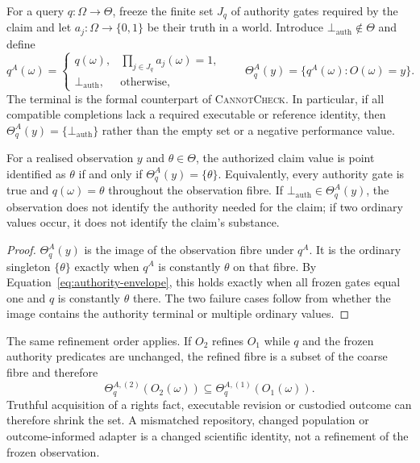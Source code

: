 For a query $q:\Omega\to\Theta$, freeze the finite set $J_q$ of authority
gates required by the claim and let $a_j:\Omega\to\{0,1\}$ be their truth in a
world. Introduce $\bot_{\mathrm{auth}}\notin\Theta$ and define
\begin{equation}
 q^A(\omega)=
 \begin{cases}
 q(\omega),&\prod_{j\in J_q}a_j(\omega)=1,\\
 \bot_{\mathrm{auth}},&\text{otherwise},
 \end{cases}
 \qquad
 \Theta^A_q(y)=\{q^A(\omega):O(\omega)=y\}.
 \label{eq:authority-envelope}
\end{equation}
The terminal is the formal counterpart of \textsc{CannotCheck}. In
particular, if all compatible completions lack a required executable or
reference identity, then $\Theta^A_q(y)=\{\bot_{\mathrm{auth}}\}$ rather than
the empty set or a negative performance value.

\begin{theorem}
\label{thm:authority-fibre}
For a realised observation $y$ and $\theta\in\Theta$, the authorized claim
value is point identified as $\theta$ if and only if
$\Theta^A_q(y)=\{\theta\}$. Equivalently, every authority gate is true and
$q(\omega)=\theta$ throughout the observation fibre. If
$\bot_{\mathrm{auth}}\in\Theta^A_q(y)$, the observation does not identify the
authority needed for the claim; if two ordinary values occur, it does not
identify the claim's substance.
\end{theorem}

\begin{proof}
$\Theta^A_q(y)$ is the image of the observation fibre under $q^A$. It is the
ordinary singleton $\{\theta\}$ exactly when $q^A$ is constantly $\theta$ on
that fibre. By Equation~\eqref{eq:authority-envelope}, this holds exactly when
all frozen gates equal one and $q$ is constantly $\theta$ there. The two
failure cases follow from whether the image contains the authority terminal or
multiple ordinary values.
\end{proof}

The same refinement order applies. If $O_2$ refines $O_1$ while $q$ and the
frozen authority predicates are unchanged, the refined fibre is a subset of
the coarse fibre and therefore
\begin{equation}
 \Theta_q^{A,(2)}(O_2(\omega))
 \subseteq
 \Theta_q^{A,(1)}(O_1(\omega)).
 \label{eq:authority-refinement}
\end{equation}
Truthful acquisition of a rights fact, executable revision or custodied
outcome can therefore shrink the set. A mismatched repository, changed
population or outcome-informed adapter is a changed scientific identity, not
a refinement of the frozen observation.

